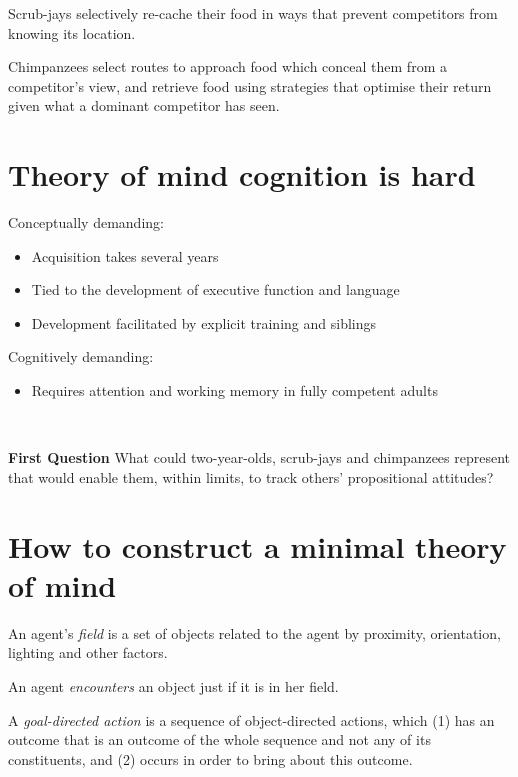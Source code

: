 \documentclass[11pt]{extarticle}
\begin{document}
\begin{multicols}{3}
Scrub-jays selectively re-cache their food in ways that prevent competitors from knowing its location.\citep{Clayton:2007fh}

Chimpanzees select routes to approach food which conceal them from a competitor’s view,\citep{Hare:2006ih} and retrieve food using strategies that optimise their return given what a dominant competitor has seen.\citep{Hare:2001ph}



\section{Theory of mind cognition is hard}
Conceptually demanding:
\begin{itemize}\itemsep0pt
\item Acquisition takes several years\citep{Wimmer:1983dz,Wellman:2001lz}
\item Tied to the development of executive function\citep{Perner:1999yr,Sabbagh:2006ke} and language\citep{Astington2005ot}
\item Development facilitated by explicit training\citep{Slaughter:1996fv} and siblings\citep{Clements:2000nc,Hughes:2004zj}
\end{itemize}
%
Cognitively demanding: 
\begin{itemize}
\item Requires attention and working memory in fully competent adults\citep{Apperly:2008jv,McKinnon:2007rr}
\end{itemize}


\

{\Large
\textbf{First Question}
What could two-year-olds, scrub-jays and chimpanzees represent that would enable them, within limits, to track others’ propositional attitudes?}




\section{How to construct a minimal theory of mind}
An agent’s \emph{field} is a set of objects related to the agent by proximity, orientation, lighting and other factors.

An agent \emph{encounters} an object just if it is in her field.

A \emph{goal-directed action} is a sequence of object-directed actions, which (1) has an outcome that  is an outcome of the whole sequence and not any of its constituents, and (2) occurs in order to bring about this outcome.



\end{multicols}
\end{document}
